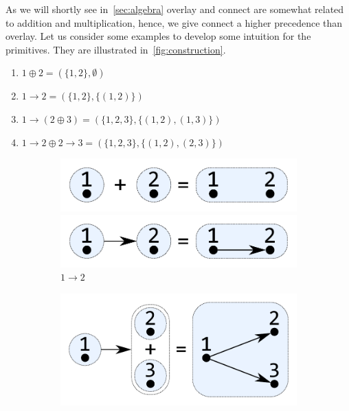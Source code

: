 \documentclass{article}
\newcommand{\overlay}{\oplus}
\newcommand{\connect}{\rightarrow}
\begin{document}
As we will shortly see in~\autoref{sec:algebra} overlay and connect are somewhat
related to addition and multiplication, hence, we give connect a higher precedence
than overlay. Let us consider some examples to develop some intuition for the
primitives. They are illustrated in~\autoref{fig:construction}.
\begin{enumerate}[label=(\alph*)]
\item $1 \overlay 2 = (\{1,2\}, \emptyset)$
\item $1 \connect 2 = (\{1,2\}, \{(1,2)\})$
\item $1 \connect (2 \overlay 3) = (\{1,2,3\}, \{(1,2), (1,3)\})$
\item $1 \connect 2 \overlay 2 \connect 3 = (\{1,2,3\}, \{(1,2), (2,3)\})$
\end{enumerate}
\begin{figure}
  \centering
  \begin{subfigure}[b]{0.3\linewidth}
    \centerline{\includegraphics[scale=0.27]{fig/ex-a.pdf}}
    \vspace{-2.4mm}
    \caption{$1 \overlay 2$}
    \centerline{\includegraphics[scale=0.27]{fig/ex-b.pdf}}
    \vspace{-2.4mm}
    \caption{$1 \connect 2$}
  \end{subfigure}
  \begin{subfigure}[b]{0.3\linewidth}
    \centerline{\includegraphics[scale=0.27]{fig/ex-c.pdf}}

\end{subfigure}
\end{figure}
\end{document}
